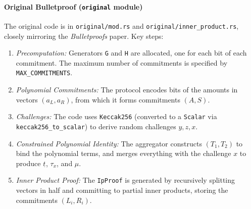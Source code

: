 \documentclass[12pt,a4paper]{article}
\begin{document}
\paragraph{Original Bulletproof (\texttt{original} module)}
The original code is in \texttt{original/mod.rs} and \texttt{original/inner\_product.rs}, closely mirroring the \textit{Bulletproofs} paper.  Key steps:
\begin{enumerate}
    \item \emph{Precomputation:} Generators \texttt{G} and \texttt{H} are allocated, one for each bit of each commitment.  The maximum number of commitments is specified by \texttt{\texttt{MAX\_COMMITMENTS}}. %
    \item \emph{Polynomial Commitments:} The protocol encodes bits of the amounts in vectors $(a_L, a_R)$, from which it forms commitments $(A, S)$. %
    \item \emph{Challenges:} The code uses \texttt{Keccak256} (converted to a \texttt{Scalar} via \\\texttt{keccak256\_to\_scalar}) to derive random challenges $y, z, x$. %
    \item \emph{Constrained Polynomial Identity:} The aggregator constructs $(T_1, T_2)$ to bind the polynomial terms, and merges everything with the challenge $x$ to produce $t_{\hat{}}$, $\tau_x$, and $\mu$. %
    \item \emph{Inner Product Proof:} The \texttt{IpProof} is generated by recursively splitting vectors in half and committing to partial inner products, storing the commitments $(L_i, R_i)$. %
\end{enumerate}
\end{document}
